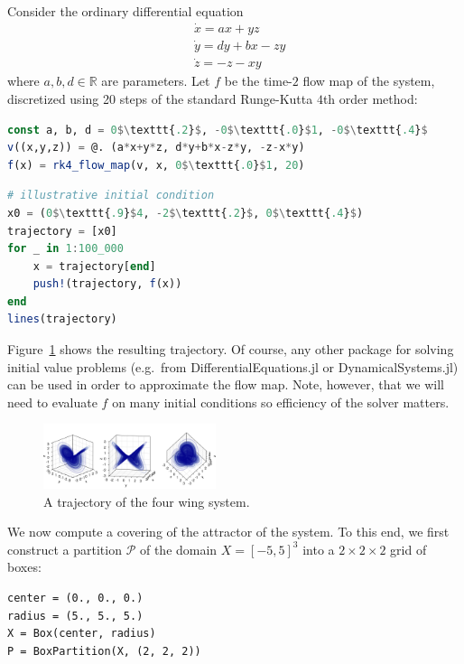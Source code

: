 \documentclass{juliacon}
\newcommand{\R}{{\mathbb R}}
\newcommand{\cP}{\mathcal{P}}
\begin{document}
Consider the ordinary differential equation \cite{3dattractor}
\begin{equation}
    \label{eq:ode}
    \begin{split}
        &\dot{x} = ax + yz \\
        &\dot{y} = dy + bx - zy \\ 
        &\dot{z} = -z - xy 
    \end{split}
\end{equation}
where $a,b,d \in \R$ are parameters. Let $f$ be the time-$2$ flow map of the system, discretized using 20 steps of the standard Runge-Kutta $4$th order method:
\begin{lstlisting}[language=Julia,label=lst:map,backgroundcolor=\color{gray10},mathescape]
const a, b, d = 0$\texttt{.2}$, -0$\texttt{.0}$1, -0$\texttt{.4}$
v((x,y,z)) = @. (a*x+y*z, d*y+b*x-z*y, -z-x*y)
f(x) = rk4_flow_map(v, x, 0$\texttt{.0}$1, 20)
\end{lstlisting}
\begin{lstlisting}[language=Julia,backgroundcolor=\color{gray10},mathescape]
# illustrative initial condition
x0 = (0$\texttt{.9}$4, -2$\texttt{.2}$, 0$\texttt{.4}$)
trajectory = [x0]
for _ in 1:100_000
    x = trajectory[end]
    push!(trajectory, f(x))
end
lines(trajectory)
\end{lstlisting}
Figure~\ref{fig:trajectories} shows the resulting trajectory.  Of course, any other package for solving initial value problems (e.g.\ from DifferentialEquations.jl or DynamicalSystems.jl) can be used in order to approximate the flow map. Note, however, that we will need to evaluate $f$ on many initial conditions so efficiency of the solver matters.
\begin{figure}[h]
    \centering
    \includegraphics[width=0.45\textwidth]{trajectories.png}
    \caption{A trajectory of the four wing system.}
    \label{fig:trajectories}
\end{figure}

We now compute a covering of the attractor of the system.  To this end, we first construct a partition $\cP$ of the domain $X = \left[ -5, 5 \right]^3$ into a $2 \times 2 \times 2$ grid of boxes: 
\begin{lstlisting}[label=lst:box,backgroundcolor=\color{gray10}]
center = (0., 0., 0.)
radius = (5., 5., 5.)
X = Box(center, radius)
P = BoxPartition(X, (2, 2, 2))
\end{lstlisting}
\end{document}
